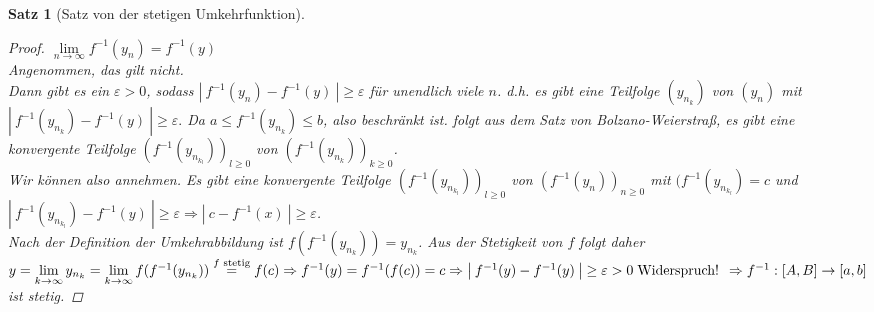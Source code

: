 \documentclass[a4paper,titlepage,oneside]{article}
\renewcommand{\epsilon}{\ensuremath{\varepsilon} }
\def\WSP{\text{Widerspruch! }}
\def\zz{\text{zu zeigen: }}
\def\sp{\hspace{0,1cm}}
\renewcommand{\liminf}[2][n]{\ensuremath{\lim\limits_{#1 \rightarrow \infty}{#2}}}
\newcommand{\abs}[1]{\ensuremath{\left|\:#1\:\right|}}
\theoremstyle{thmstyle}
\newtheorem{satz}{Satz}[section]
\theoremstyle{subthmstyle}
\begin{document}
\begin{satz}[Satz von der stetigen Umkehrfunktion]
\begin{proof}
\zz $\liminf{f^{-1}(y_n)} = f^{-1}(y)$\\
Angenommen, das gilt nicht.\\
Dann gibt es ein $\epsilon > 0$, sodass $\abs{f^{-1}(y_n) - f^{-1}(y)} \ge \epsilon$ für unendlich viele $n$. d.h. es gibt eine Teilfolge $(y_{n_k})$ von $(y_n)$ mit $\abs{f^{-1}(y_{n_k}) - f^{-1}(y)} \ge \epsilon.$ Da $a \le f^{-1}(y_{n_k}) \le b$, also beschränkt ist. folgt aus dem Satz von Bolzano-Weierstraß, es gibt eine konvergente Teilfolge $(f^{-1}(y_{n_{k_l}}))_{l \ge 0}$ von $(f^{-1}(y_{n_k}))_{k \ge 0}$.\\
Wir können also annehmen. Es gibt eine konvergente Teilfolge $(f^{-1}(y_{n_{k_l}}))_{l \ge 0}$ von $(f^{-1}(y_n))_{n \ge 0}$ mit $(f^{-1}(y_{n_{k_l}}) = c$  und $\abs{f^{-1}(y_{n_{k_l}}) - f^{-1}(y)} \ge \epsilon \Rightarrow \abs{c - f^{-1}(x)} \ge \epsilon$. \\
 Nach der Definition der Umkehrabbildung ist $f(f^{-1}(y_{n_k})) = y_{n_k}$. Aus der Stetigkeit von $f$ folgt daher $y = \liminf[k]{y_{n_k}} = \liminf[k]{f(f^{-1}(y_{n_k}))}  \overset{f \text{ stetig}}{=} f(c)\\
 \Rightarrow f^{-1}(y) = f^{-1}(f(c)) = c
 \vphantom{\frac{1}{2}} \Rightarrow \abs{f^{-1}(y) - f^{-1}(y)} \ge \epsilon > 0 \sp \WSP \Rightarrow f^{-1}:[A,B] \to [a,b] $ ist stetig.
\end{proof}
\end{satz}
\end{document}
